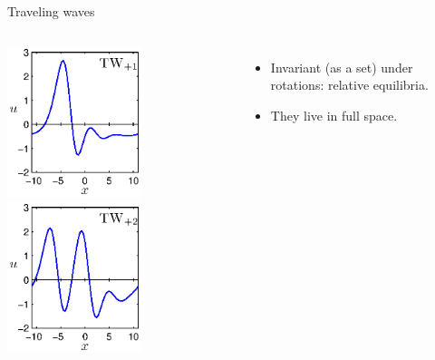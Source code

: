\documentclass{beamer}
\begin{document}
\begin{frame}{Traveling waves}
 \begin{columns}
 \includegraphics[width=0.6\textwidth,clip=true]{../../figs/ks22_TW1_profile}\\
 \includegraphics[width=0.6\textwidth,clip=true]{../../figs/ks22_TW2_profile}%
 \begin{itemize}
 \item Invariant (as a set) under rotations: relative equilibria.
 \item<alert@2-> They live in full space.



\end{itemize}

 \end{columns}
\end{frame}
\end{document}
